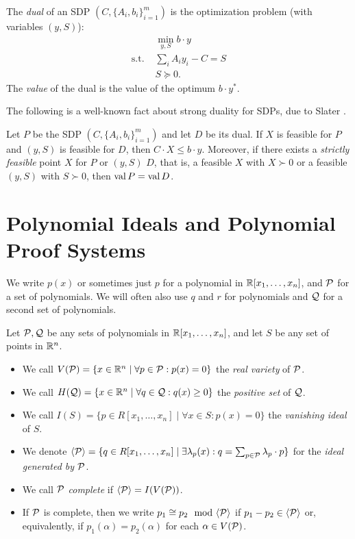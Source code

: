 \begin{definition}
The \emph{dual} of an SDP $(C, \{A_i, b_i\}_{i=1}^m)$ is the optimization problem (with variables $(y,S)$):
\begin{align*}
&\min_{y,S} b \cdot y \\
\text{s.t. }&\sum_i A_i y_i - C = S \\
&S \succeq 0.
\end{align*}
The \emph{value} of the dual is the value of the optimum $b \cdot y^*$.
\end{definition}
The following is a well-known fact about strong duality for SDPs, due to Slater \cite{Slater2014}.
\begin{lemma}\label{lem:duality}
Let $P$ be the SDP $(C, \{A_i, b_i\}_{i=1}^m)$ and let $D$ be its dual. If $X$ is feasible for $P$ and $(y,S)$ is feasible for $D$, then $C \cdot X \leq b \cdot y$. Moreover, if there exists a \emph{strictly feasible} point $X$ for $P$ or $(y,S)$ $D$, that is, a feasible $X$ with $X \succ 0$ or a feasible $(y,S)$ with $S \succ 0$, then $\operatorname{val}{P} = \operatorname{val}{D}$.
\end{lemma}

\section{Polynomial Ideals and Polynomial Proof Systems}\label{sec:polyproofs}
We write $p(x)$ or sometimes just $p$ for a polynomial in $\mathbb R[x_1,\dots,x_n]$, and $\mathcal P$ for a set of polynomials.
We will often also use $q$ and $r$ for polynomials and $\mathcal Q$ for a second set of polynomials.
\begin{definition}\label{def:ideals}
Let $\mathcal P,\mathcal Q$ be any sets of polynomials in $\mathbb R[x_1,\dots,x_n]$, and let $S$ be any set of points in $\mathbb R^n$.
\begin{itemize}
\item We call $V(\mathcal P) = \{x \in \mathbb R^n \mid \forall p \in \mathcal P: p(x) = 0\}$ the \emph{real variety} of $\mathcal P$.
\item We call $H(\mathcal Q) = \{x \in \mathbb R^n \mid \forall q \in \mathcal Q: q(x) \geq 0\}$ the \emph{positive set} of $\mathcal Q$.
\item We call $I(S) = \{p \in R[x_1,\dots,x_n] \mid \forall x \in S: p(x) = 0\}$ the \emph{vanishing ideal} of $S$.
\item We denote $\langle \mathcal P \rangle = \{q \in R[x_1,\dots,x_n] \mid \exists \lambda_p(x): q = \sum_{p \in \mathcal P} \lambda_p \cdot p\}$ for the \emph{ideal generated by $\mathcal P$}.
\item We call $\mathcal P$ \emph{complete} if $\langle \mathcal P \rangle = I(V(\mathcal P))$.
\item If $\mathcal P$ is complete, then we write $p_1 \cong p_2 \mod \gen{\cP}$ if $p_1 - p_2 \in \langle \mathcal P \rangle$ or, equivalently, if $p_1(\alpha) = p_2(\alpha)$ for each $\alpha \in V(\mathcal P)$.
\end{itemize}
\end{definition}

